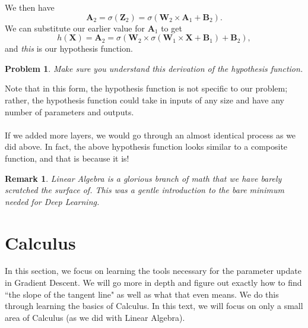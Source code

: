 \documentclass{article}
\newtheorem*{remark}{Remark}
\newtheorem*{problem}{Problem}
\begin{document}
We then have 
\[\textbf{A}_2=\sigma(\textbf{Z}_2)=\sigma(\textbf{W}_2\times \textbf{A}_1+\textbf{B}_2).\]
We can substitute our earlier value for $\textbf{A}_1$ to get 
\[h(\textbf{X})=\textbf{A}_2=\sigma(\textbf{W}_2\times \sigma(\textbf{W}_1\times \textbf{X}+\textbf{B}_1)+\textbf{B}_2),\]
and \textit{this} is our hypothesis function. 
\begin{problem}
Make sure you understand this derivation of the hypothesis function. 
\end{problem}
Note that in this form, the hypothesis function is not specific to our problem; rather, the hypothesis function could take in inputs of any size and have any number of parameters and outputs.
\\
\\
If we added more layers, we would go through an almost identical process as we did above. In fact, the above hypothesis function looks similar to a composite function, and that is because it is! 

\begin{remark}
Linear Algebra is a glorious branch of math that we have barely scratched the surface of. This was a gentle introduction to the bare minimum needed for Deep Learning. 
\end{remark}

\section{Calculus}
In this section, we focus on learning the tools necessary for the parameter update in Gradient Descent. We will go more in depth and figure out exactly how to find ``the slope of the tangent line" as well as what that even means. We do this through learning the basics of Calculus. In this text, we will focus on only a small area of Calculus (as we did with Linear Algebra).
\end{document}

